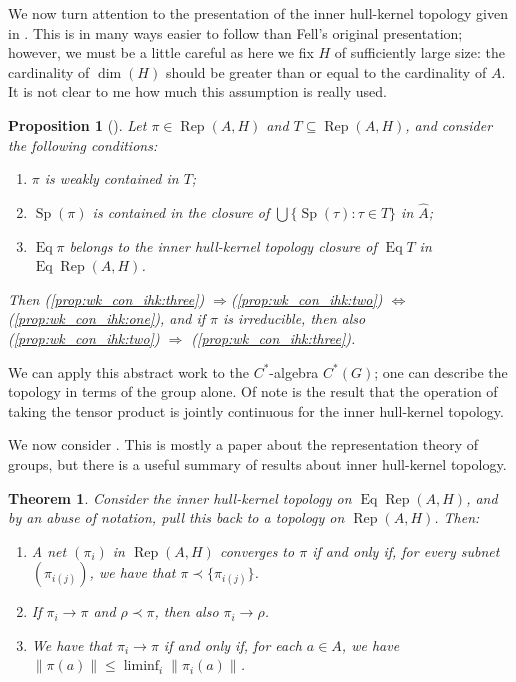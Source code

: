 \documentclass[a4paper,11pt]{article}
\newcommand{\Rep}{\operatorname{Rep}}
\newcommand{\Eq}{\operatorname{Eq}}
\newcommand{\Sp}{\operatorname{Sp}}
\newtheorem{proposition}[lemma]{Proposition}
\newtheorem{theorem}[lemma]{Theorem}
\begin{document}
We now turn attention to the presentation of the inner hull-kernel topology
given in \cite[Chapter~5]{kan}.  This is in many ways easier to follow
than Fell's original presentation; however, we must be a little careful as
here we fix $H$ of sufficiently large size: the cardinality of $\dim(H)$ should
be greater than or equal to the cardinality of $A$.  It is not clear to me
how much this assumption is really used.

\begin{proposition}[{\cite[Proposition~5.11]{kan}}]
Let $\pi\in\Rep(A,H)$ and $T\subseteq\Rep(A,H)$, and consider the following
conditions:
\begin{enumerate}
\item\label{prop:wk_con_ihk:one} $\pi$ is weakly contained in $T$;
\item\label{prop:wk_con_ihk:two} $\Sp(\pi)$ is contained in the closure of
$\bigcup\{\Sp(\tau) : \tau\in T\}$ in $\hat A$;
\item\label{prop:wk_con_ihk:three} $\Eq\pi$ belongs to the inner hull-kernel
topology closure of $\Eq T$ in $\Eq\Rep(A,H)$.
\end{enumerate}
Then (\ref{prop:wk_con_ihk:three}) $\Rightarrow $(\ref{prop:wk_con_ihk:two})
$\Leftrightarrow$ (\ref{prop:wk_con_ihk:one}), and if $\pi$ is irreducible,
then also (\ref{prop:wk_con_ihk:two}) $\Rightarrow$
(\ref{prop:wk_con_ihk:three}).
\end{proposition}

We can apply this abstract work to the $C^*$-algebra $C^*(G)$; one can
describe the topology in terms of the group alone.  Of note is the result
that the operation of taking the tensor product is jointly continuous for
the inner hull-kernel topology.

We now consider \cite{fell3}.  This is mostly a paper about the representation
theory of groups, but there is a useful summary of results about inner
hull-kernel topology.

\begin{theorem}\label{thm:ihkt_char}
Consider the inner hull-kernel topology on $\Eq\Rep(A,H)$, and by an abuse of
notation, pull this back to a topology on $\Rep(A,H)$.  Then:
\begin{enumerate}
\item{\cite[Proposition~1.2]{fell3}}\label{thm:ihkt_char:one}
A net $(\pi_i)$ in $\Rep(A,H)$ converges
to $\pi$ if and only if, for every subnet $(\pi_{i(j)})$, we have that
$\pi \prec \{ \pi_{i(j)} \}$.
\item{\cite[Proposition~1.3]{fell3}}\label{thm:ihkt_char:two}
If $\pi_i\rightarrow\pi$ and
$\rho\prec\pi$, then also $\pi_i\rightarrow\rho$.
\item{\cite[Proposition~1.4]{fell3}}\label{thm:ihkt_char:three}
We have that $\pi_i\rightarrow\pi$ if and
only if, for each $a\in A$, we have $\|\pi(a)\| \leq \liminf_i \|\pi_i(a)\|$.
\end{enumerate}
\end{theorem}
\end{document}
